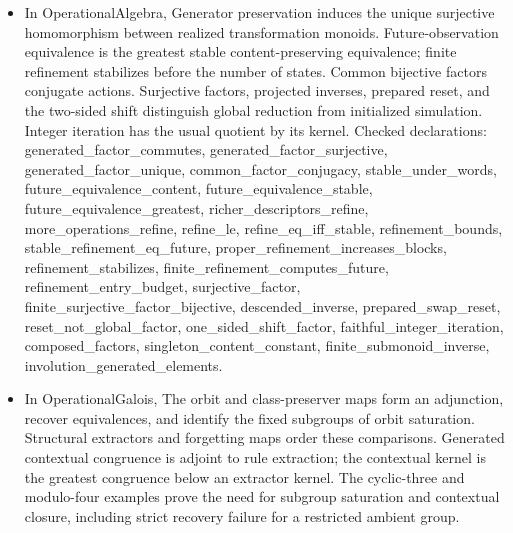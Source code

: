 \documentclass[11pt,a4paper]{article}
\newcommand{\lean}[1]{{\ttfamily\small
  \let\leanunderscore\_\def\_{\leanunderscore\allowbreak}#1}}
\begin{document}
\begin{itemize}[leftmargin=1.4em,itemsep=1pt]
{construction, uniform coding constants, and the spectral limit remain
paper-level obligations.\par}
\item {\raggedright In \lean{OperationalAlgebra}, Generator preservation induces the unique surjective homomorphism between realized transformation monoids. Future-observation equivalence is the greatest stable content-preserving equivalence; finite refinement stabilizes before the number of states. Common bijective factors conjugate actions. Surjective factors, projected inverses, prepared reset, and the two-sided shift distinguish global reduction from initialized simulation. Integer iteration has the usual quotient by its kernel.
Checked declarations: \lean{generated\_factor\_commutes}, \lean{generated\_factor\_surjective}, \lean{generated\_factor\_unique}, \lean{common\_factor\_conjugacy}, \lean{stable\_under\_words}, \lean{future\_equivalence\_content}, \lean{future\_equivalence\_stable}, \lean{future\_equivalence\_greatest}, \lean{richer\_descriptors\_refine}, \lean{more\_operations\_refine}, \lean{refine\_le}, \lean{refine\_eq\_iff\_stable}, \lean{refinement\_bounds}, \lean{stable\_refinement\_eq\_future}, \lean{proper\_refinement\_increases\_blocks}, \lean{refinement\_stabilizes}, \lean{finite\_refinement\_computes\_future}, \lean{refinement\_entry\_budget}, \lean{surjective\_factor}, \lean{finite\_surjective\_factor\_bijective}, \lean{descended\_inverse}, \lean{prepared\_swap\_reset}, \lean{reset\_not\_global\_factor}, \lean{one\_sided\_shift\_factor}, \lean{faithful\_integer\_iteration}, \lean{composed\_factors}, \lean{singleton\_content\_constant}, \lean{finite\_submonoid\_inverse}, \lean{involution\_generated\_elements}.\par}
\item {\raggedright In \lean{OperationalGalois}, The orbit and class-preserver maps form an adjunction, recover equivalences, and identify the fixed subgroups of orbit saturation. Structural extractors and forgetting maps order these comparisons. Generated contextual congruence is adjoint to rule extraction; the contextual kernel is the greatest congruence below an extractor kernel. The cyclic-three and modulo-four examples prove the need for subgroup saturation and contextual closure, including strict recovery failure for a restricted ambient group.
}
\end{itemize}
\end{document}
